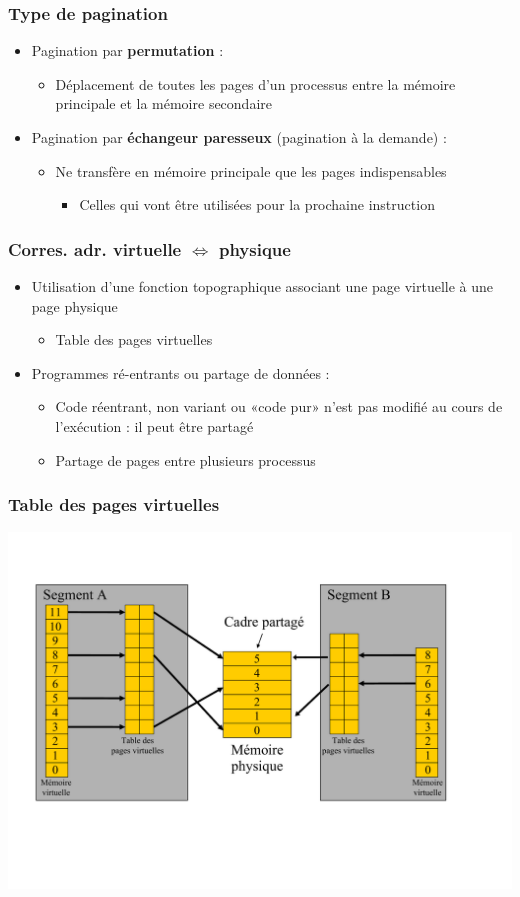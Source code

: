 \begin{frame}
\frametitle{Type de pagination}
\begin{itemize}
\item Pagination par \textbf{permutation} :
\begin{itemize}
\item Déplacement de toutes les pages d'un processus entre la mémoire principale et la mémoire secondaire
\end{itemize}
\item Pagination par \textbf{échangeur paresseux} (pagination à la demande) :
\begin{itemize}
\item Ne transfère en mémoire principale que les pages indispensables
\begin{itemize}
\item Celles qui vont être utilisées pour la prochaine instruction
\end{itemize}
\end{itemize}
\end{itemize}
\end{frame}


\begin{frame}
\frametitle{Corres. adr. virtuelle  $\Leftrightarrow$  physique}
\begin{itemize}
\item Utilisation d'une fonction topographique associant une page virtuelle à une page physique 
\begin{itemize}
\item Table des pages virtuelles
\end{itemize}
\item Programmes ré-entrants ou partage de données :
\begin{itemize}
\item Code réentrant, non variant ou «code pur» n'est pas modifié au cours de l'exécution : il peut être partagé
\item Partage de pages entre plusieurs processus
\end{itemize}
\end{itemize}
\end{frame}


\begin{frame}
\frametitle{Table des pages virtuelles}
\includegraphics[width=.9\textwidth]{../illustration/table_pages_virtuelles.pdf}
\end{frame}

